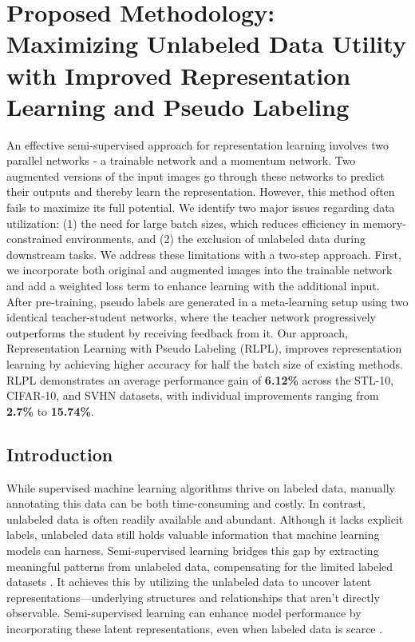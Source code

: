 \section{Proposed Methodology: Maximizing Unlabeled Data Utility with Improved Representation Learning and Pseudo Labeling}

An effective semi-supervised approach for representation learning involves two parallel networks - a trainable network and a momentum network. Two augmented versions of the input images go through these networks to predict their outputs and thereby learn the representation. However, this method often fails to maximize its full potential. We identify two major issues regarding data utilization: (1) the need for large batch sizes, which reduces efficiency in memory-constrained environments, and (2) the exclusion of unlabeled data during downstream tasks. We address these limitations with a two-step approach. First, we incorporate both original and augmented images into the trainable network and add a weighted loss term to enhance learning with the additional input. After pre-training, pseudo labels are generated in a meta-learning setup using two identical teacher-student networks, where the teacher network progressively outperforms the student by receiving feedback from it. Our approach, Representation Learning with Pseudo Labeling (RLPL), improves representation learning by achieving higher accuracy for half the batch size of existing methods. RLPL demonstrates an average performance gain of \textbf{6.12\%} across the STL-10, CIFAR-10, and SVHN datasets, with individual improvements ranging from  \textbf{2.7\%} to \textbf{15.74\%}.

\subsection{Introduction}


While supervised machine learning algorithms thrive on labeled data, manually annotating this data can be both time-consuming and costly. In contrast, unlabeled data is often readily available and abundant. Although it lacks explicit labels,  unlabeled data still holds valuable information that machine learning models can harness. Semi-supervised learning bridges this gap by extracting meaningful patterns from unlabeled data, compensating for the limited labeled datasets \cite{kingma2014semi}. It achieves this by utilizing the unlabeled data to uncover latent representations—underlying structures and relationships that aren't directly observable. Semi-supervised learning can enhance model performance by incorporating these latent representations, even when labeled data is scarce \cite{devillers2024semi, kutuzova2021multimodal}.

